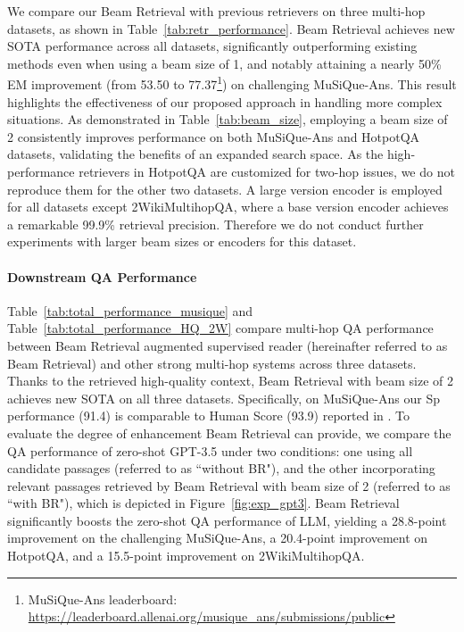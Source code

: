 \documentclass[10.5pt]{article}
\begin{document}
We compare our Beam Retrieval with previous retrievers on three multi-hop datasets, as shown in Table~\ref{tab:retr_performance}. Beam Retrieval achieves new SOTA performance across all datasets, significantly outperforming existing methods even when using a beam size of 1, and notably attaining a nearly 50\% EM improvement (from 53.50 to 77.37\footnote{MuSiQue-Ans leaderboard: \url{https://leaderboard.allenai.org/musique_ans/submissions/public}}) on challenging MuSiQue-Ans. This result highlights the effectiveness of our proposed approach in handling more complex situations. As demonstrated in Table~\ref{tab:beam_size}, employing a beam size of 2 consistently improves performance on both MuSiQue-Ans and HotpotQA datasets, validating the benefits of an expanded search space. As the high-performance retrievers in HotpotQA are customized for two-hop issues, we do not reproduce them for the other two datasets. A large version encoder is employed for all datasets except 2WikiMultihopQA, where a base version encoder achieves a remarkable 99.9\% retrieval precision. Therefore we do not conduct further experiments with larger beam sizes or encoders for this dataset. 



\paragraph{Downstream QA Performance}
Table~\ref{tab:total_performance_musique} and Table~\ref{tab:total_performance_HQ_2W} compare multi-hop QA performance between Beam Retrieval augmented supervised reader (hereinafter referred to as Beam Retrieval) and other strong multi-hop systems across three datasets. Thanks to the retrieved high-quality context, Beam Retrieval with beam size of 2 achieves new SOTA on all three datasets. Specifically, on MuSiQue-Ans our Sp performance (91.4) is comparable to Human Score (93.9) reported in \cite{musique}. To evaluate the degree of enhancement Beam Retrieval can provide, we compare the QA performance of zero-shot GPT-3.5 under two conditions: one using all candidate passages (referred to as ``without BR"), and the other incorporating relevant passages retrieved by Beam Retrieval with beam size of 2 (referred to as ``with BR"), which is depicted in Figure~\ref{fig:exp_gpt3}. Beam Retrieval significantly boosts the zero-shot QA performance of LLM, yielding a 28.8-point improvement on the challenging MuSiQue-Ans, a 20.4-point improvement on HotpotQA, and a 15.5-point improvement on 2WikiMultihopQA.
\end{document}
